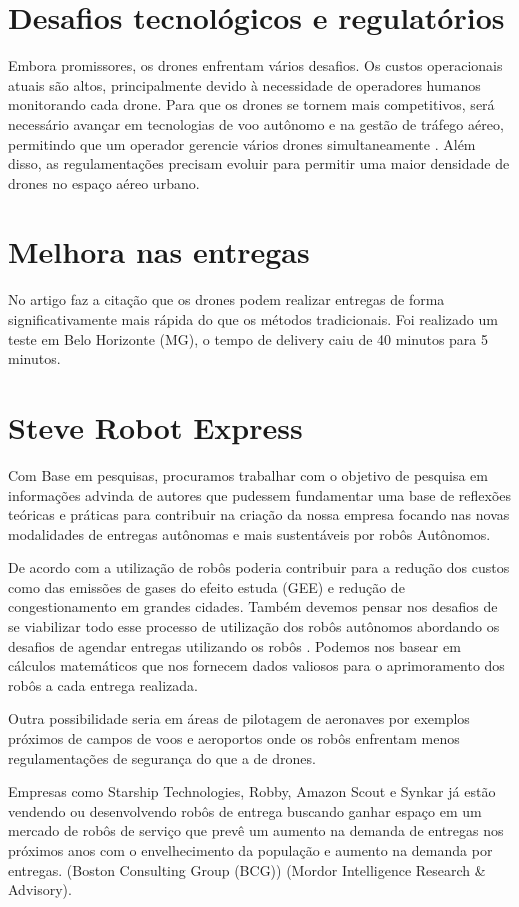     \section{Desafios tecnológicos e regulatórios}
    
Embora promissores, os drones enfrentam vários desafios. Os custos
operacionais atuais são altos, principalmente devido à necessidade de operadores humanos monitorando cada drone. Para que os drones se
tornem mais competitivos, será necessário avançar em tecnologias de voo autônomo e na gestão de tráfego aéreo, permitindo que um operador gerencie vários drones simultaneamente \cite{cornell2023drones}. Além disso, as regulamentações precisam evoluir para permitir uma maior densidade de drones no espaço aéreo urbano.

    \section{Melhora nas entregas}

No artigo \cite{Submit2022} faz a citação que os drones podem realizar entregas de forma significativamente mais rápida do que os métodos tradicionais. Foi realizado um teste em Belo Horizonte (MG), o tempo de delivery caiu de 40 minutos para 5 minutos.

	\section{Steve Robot Express}

Com Base em pesquisas, procuramos trabalhar com o objetivo de pesquisa em informações advinda de autores que pudessem fundamentar uma base de reflexões teóricas e práticas para contribuir na criação da nossa empresa focando nas novas modalidades de entregas autônomas e mais sustentáveis por robôs Autônomos.

De acordo com \cite{Bakach2020} a utilização de robôs poderia contribuir para a redução dos custos como das emissões de gases do efeito estuda (GEE) e redução de congestionamento em grandes cidades. Também devemos pensar nos desafios de se viabilizar todo esse processo de utilização dos robôs autônomos abordando os desafios de agendar entregas utilizando os robôs \cite{BoysenN2018}. Podemos nos basear em cálculos matemáticos que nos fornecem dados valiosos para o aprimoramento dos robôs a cada entrega realizada. 

Outra possibilidade seria em áreas de pilotagem de aeronaves por exemplos próximos de campos de voos e aeroportos \cite{faa2018} onde os robôs enfrentam menos regulamentações de segurança do que a de drones.

Empresas como Starship Technologies, Robby, Amazon Scout e Synkar já estão vendendo ou desenvolvendo robôs de entrega buscando ganhar espaço em um mercado de robôs de serviço que prevê um aumento na demanda de entregas nos próximos anos com o envelhecimento da população e aumento na demanda por entregas. (Boston Consulting Group (BCG)) (Mordor Intelligence Research \& Advisory).
